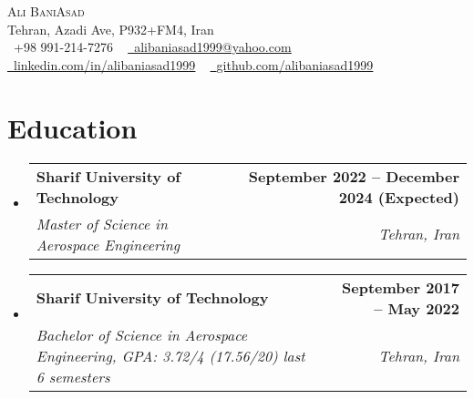 \documentclass[letterpaper,11pt]{article}
\makeatletter
\newcommand{\resumeSubheading}[4]{
  \vspace{-2pt}\item
    \begin{tabular*}{1.0\textwidth}[t]{l@{\extracolsep{\fill}}r}
      \textbf{ #1} & \textbf{\small #2} \\
      \textsl{\small #3} & \textit{\small #4} \\
    \end{tabular*}\vspace{-7pt}
}
\newcommand{\resumeSubHeadingListStart}{\begin{itemize}[leftmargin=0.0in, label={}]}
\newcommand{\resumeSubHeadingListEnd}{\end{itemize}}
\makeatother
\begin{document}
\begin{center}
    {\Huge \scshape Ali BaniAsad} \\ \vspace{1pt}
    Tehran, Azadi Ave, P932+FM4, Iran \\ \vspace{1pt}
    \small \raisebox{-0.1\height}\faPhone\ +98 991-214-7276 ~ \href{mailto:alibaniasad1999@yahoo.com}{\raisebox{-0.2\height}\faEnvelope\  \underline{alibaniasad1999@yahoo.com}} ~
    \href{https://linkedin.com/in/alibaniasad1999/}{\raisebox{-0.2\height}\faLinkedin\ \underline{linkedin.com/in/alibaniasad1999}}  ~
    \href{https://github.com/alibaniasad1999}{\raisebox{-0.2\height}\faGithub\ \underline{github.com/alibaniasad1999}}
    \vspace{-8pt}
\end{center}


\section{Education}
  \resumeSubHeadingListStart

  \resumeSubheading
  {Sharif University of Technology}{September 2022 -- December 2024 (Expected)}
  {Master of Science in Aerospace Engineering}{Tehran, Iran}
  \vspace{-3pt}

    \resumeSubheading
      {Sharif University of Technology}{September 2017 -- May 2022}
      {Bachelor of Science in Aerospace Engineering,
      GPA: 3.72/4 (17.56/20) last 6 semesters
      }{Tehran, Iran}



  \resumeSubHeadingListEnd


 \vspace{-18pt}
\end{document}

